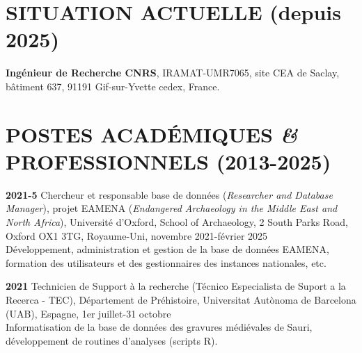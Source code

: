 \documentclass{article}
\newcommand{\fr}[1]{#1}       %
\newcommand{\en}[1]{}     %
\begin{document}
\section{\fr{SITUATION ACTUELLE (depuis 2025)}\en{CURRENT SITUATION (since 2025)}}
\fr{\textbf{Ingénieur de Recherche CNRS}}\en{\textbf{Research Engineer CNRS}}, IRAMAT-UMR7065, site CEA de Saclay, bâtiment 637, 91191 Gif-sur-Yvette cedex, France.

\section{\fr{POSTES ACADÉMIQUES \textit{\&} PROFESSIONNELS (2013-2025)}\en{ACADEMIC \textit{\&} PROFESSIONAL POSITIONS (2013-2025)}}

\textbf{2021-5} 
\fr{Chercheur et responsable base de données (\textit{Researcher and Database Manager}), projet EAMENA (\textit{Endangered Archaeology in the Middle East and North Africa}), Université d'Oxford, School of Archaeology, 2 South Parks Road, Oxford OX1 3TG, Royaume-Uni, novembre 2021-février 2025\\
\hspace*{0.5cm} Développement, administration et gestion de la base de données EAMENA, formation des utilisateurs et des gestionnaires des instances nationales, etc.}
\en{Researcher and Database Manager for EAMENA (\textit{Endangered Archaeology in the Middle East and North Africa}), University of Oxford, School of Archaeology, 2 South Parks Road, Oxford OX1 3TG, United Kingdom, November 2021- January 2025\\
\hspace*{0.5cm} Development, administration, and management of the EAMENA database, training of users and managers of national instances, etc.}

\smallbreak
\textbf{2021} 
\fr{Technicien de Support à la recherche (Técnico Especialista de Suport a la Recerca - TEC), Département de Préhistoire, Universitat Autònoma de Barcelona (UAB), Espagne, 1er juillet-31 octobre \\
\hspace*{0.5cm} Informatisation de la base de données des gravures médiévales de Sauri, développement de routines d'analyses (scripts R).}
\en{Research Support Technician (Técnico Especialista de Suport a la Recerca - TEC), Department of Prehistory, Universitat Autònoma de Barcelona (UAB), Spain, July 1 - October 31 \\
\hspace*{0.5cm} Computerization of the database of medieval engravings from Sauri, development of analysis routines (R scripts).}
\end{document}
